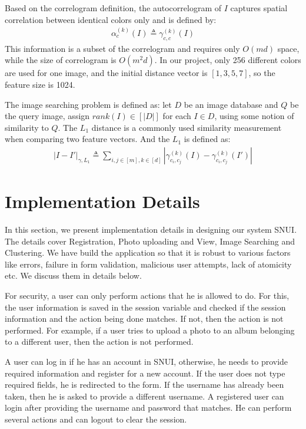 \documentclass[10pt,twocolumn,letterpaper]{article}
\begin{document}
Based on the correlogram definition, the autocorrelogram of $I$ captures spatial correlation between identical colors only and is defined by:
\begin{equation}
	\begin{aligned}
		\alpha_{c}^{(k)}(I) \triangleq \gamma_{c,c}^{(k)}(I)
	\end{aligned}
\end{equation}
This information is a subset of the correlogram and requires only $O(md)$ space, while the size of correlogram is $O(m^2d)$.
In our project, only 256 different colors are used for one image, and the initial distance vector is $[1,3,5,7]$, so the feature size is 1024.

The image searching problem is defined as: let $D$ be an image database and $Q$ be the query image, assign $rank(I) \in [|D|]$ for each $I \in D$, using some notion of similarity to $Q$. The $L_{1}$ distance is a commonly used similarity measurement when comparing two feature vectors. And the $L_{1}$ is defined as:
\begin{equation}
	\begin{aligned}
		|I-I'|_{\gamma,L_{1}} \triangleq \sum_{i,j \in [m],k \in [d]} |\gamma_{c_{i},c_{j}}^{(k)}(I)-\gamma_{c_{i},c_{j}}^{(k)}(I')|
	\end{aligned}
\end{equation}

\section{Implementation Details}
In this section, we present implementation details in designing our system SNUI. The details cover Registration, Photo uploading and View, Image Searching and Clustering. We have build the application so that it is robust to various factors like errors, failure in form validation, malicious user attempts, lack of atomicity etc. We discuss them in details below.

For security, a user can only perform actions that he is allowed to do. For this, the user information is saved in the session variable and checked if the session information and the action being done matches. If not, then the action is not performed. For example, if a user tries to upload a photo to an album belonging to a different user, then the action is not performed.

A user can log in if he has an account in SNUI, otherwise, he needs to provide required information and register for a new account. If the user does not type required fields, he is redirected to the form. If the username has already been taken, then he is asked to provide a different username. A registered user can login after providing the username and password that matches. He can perform several actions and can logout to clear the session.
\end{document}
